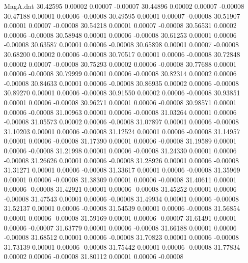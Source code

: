 \begin{filecontents}{MagA.dat}
  30.42595    0.00002    0.00007   -0.00007
  30.44896    0.00002    0.00007   -0.00008
  30.47188    0.00001    0.00006   -0.00008
  30.49595    0.00001    0.00007   -0.00008
  30.51907    0.00001    0.00007   -0.00008
  30.54218    0.00001    0.00007   -0.00008
  30.56531    0.00002    0.00006   -0.00008
  30.58948    0.00001    0.00006   -0.00008
  30.61253    0.00001    0.00006   -0.00008
  30.63587    0.00001    0.00006   -0.00008
  30.65898    0.00001    0.00007   -0.00008
  30.68200    0.00002    0.00006   -0.00008
  30.70517    0.00001    0.00006   -0.00008
  30.72848    0.00002    0.00007   -0.00008
  30.75293    0.00002    0.00006   -0.00008
  30.77688    0.00001    0.00006   -0.00008
  30.79999    0.00001    0.00006   -0.00008
  30.82314    0.00002    0.00006   -0.00008
  30.84633    0.00001    0.00006   -0.00008
  30.86935    0.00002    0.00006   -0.00008
  30.89270    0.00001    0.00006   -0.00008
  30.91550    0.00002    0.00006   -0.00008
  30.93851    0.00001    0.00006   -0.00008
  30.96271    0.00001    0.00006   -0.00008
  30.98571    0.00001    0.00006   -0.00008
  31.00963    0.00001    0.00006   -0.00008
  31.03264    0.00001    0.00006   -0.00008
  31.05573    0.00002    0.00006   -0.00008
  31.07897    0.00001    0.00006   -0.00008
  31.10203    0.00001    0.00006   -0.00008
  31.12524    0.00001    0.00006   -0.00008
  31.14957    0.00001    0.00006   -0.00008
  31.17390    0.00001    0.00006   -0.00008
  31.19589    0.00001    0.00006   -0.00008
  31.21998    0.00001    0.00006   -0.00008
  31.24330    0.00001    0.00006   -0.00008
  31.26626    0.00001    0.00006   -0.00008
  31.28926    0.00001    0.00006   -0.00008
  31.31271    0.00001    0.00006   -0.00008
  31.33617    0.00001    0.00006   -0.00008
  31.35969    0.00001    0.00006   -0.00008
  31.38309    0.00001    0.00006   -0.00008
  31.40611    0.00001    0.00006   -0.00008
  31.42921    0.00001    0.00006   -0.00008
  31.45252    0.00001    0.00006   -0.00008
  31.47543    0.00001    0.00006   -0.00008
  31.49934    0.00001    0.00006   -0.00008
  31.52137    0.00001    0.00006   -0.00008
  31.54539    0.00001    0.00006   -0.00008
  31.56854    0.00001    0.00006   -0.00008
  31.59169    0.00001    0.00006   -0.00007
  31.61491    0.00001    0.00006   -0.00007
  31.63779    0.00001    0.00006   -0.00008
  31.66188    0.00001    0.00006   -0.00008
  31.68512    0.00001    0.00006   -0.00008
  31.70823    0.00001    0.00006   -0.00008
  31.73139    0.00001    0.00006   -0.00008
  31.75442    0.00001    0.00006   -0.00008
  31.77834    0.00002    0.00006   -0.00008
  31.80112    0.00001    0.00006   -0.00008

\end{filecontents}
